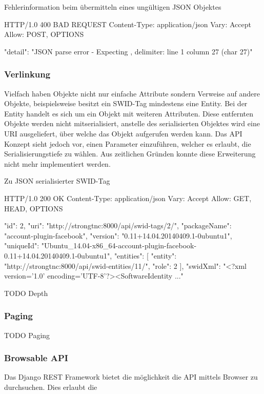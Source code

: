 \begin{listing}
\caption{Fehlerinformation beim übermitteln eines ungültigen JSON Objektes}
\begin{httpcode}
HTTP/1.0 400 BAD REQUEST
Content-Type: application/json
Vary: Accept
Allow: POST, OPTIONS

{
    "detail": "JSON parse error - Expecting , delimiter: line 1 column 27 (char 27)"
}
\end{httpcode}
\end{listing}

\subsubsection{Verlinkung}
Vielfach haben Objekte nicht nur einfache Attribute sondern Verweise auf andere Objekte, beispielsweise besitzt ein SWID-Tag mindestens eine Entity.
Bei der Entity handelt es sich um ein Objekt mit weiteren Attributen. Diese entfernten Objekte werden nicht mitserialisiert, anstelle des serialisierten Objektes wird eine URI ausgeliefert, über welche das Objekt aufgerufen werden kann. Das API Konzept sieht jedoch vor, einen Parameter einzuführen, welcher es erlaubt, die Serialisierungstiefe zu wählen. Aus zeitlichen Gründen konnte diese Erweiterung nicht mehr implementiert werden.

\begin{listing}
\caption{Zu JSON serialisierter SWID-Tag}
\begin{httpcode}
HTTP/1.0 200 OK
Content-Type: application/json
Vary: Accept
Allow: GET, HEAD, OPTIONS

{
    "id": 2, 
    "uri": "http://strongtnc:8000/api/swid-tags/2/", 
    "packageName": "account-plugin-facebook", 
    "version": "0.11+14.04.20140409.1-0ubuntu1", 
    "uniqueId": "Ubuntu_14.04-x86_64-account-plugin-facebook-0.11+14.04.20140409.1-0ubuntu1", 
    "entities": [
        {
            "entity": "http://strongtnc:8000/api/swid-entities/11/", 
            "role": 2
        }
    ], 
    "swidXml": "<?xml version='1.0' encoding='UTF-8'?>\n<SoftwareIdentity ..."
}
\end{httpcode}
\end{listing}

TODO Depth

\subsubsection{Paging}
TODO Paging

\subsubsection{Browsable API}
Das Django REST Framework bietet die möglichkeit die API mittels Browser zu durchsuchen. Dies erlaubt die












